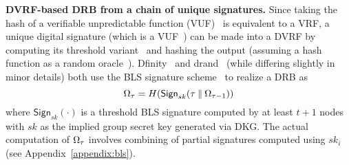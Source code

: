 \noindent\textbf{DVRF-based DRB from a chain of unique signatures.} Since taking the hash of a verifiable unpredictable function (VUF)~\cite{micali1999verifiable} is equivalent to a VRF, a unique digital signature (which is a VUF~\cite{dodis2005verifiable}) can be made into a DVRF by computing its threshold variant~\cite{boldyreva2003threshold} and hashing the output (assuming a hash function as a random oracle~\cite{bellare1993random}). Dfinity~\cite{camenisch2022internet} and drand~\cite{drand} (while differing slightly in minor details) both use the BLS signature scheme~\cite{boneh2001short} to realize a DRB as
\[
\Omega_\tau = H(\mathsf{Sign}_{sk}(\tau \mathbin\Vert \Omega_{\tau - 1}))
\]
where $\mathsf{Sign}_{sk}(\cdot)$ is a threshold BLS signature computed by at least $t + 1$ nodes with $sk$ as the implied group secret key generated via DKG. The actual computation of $\Omega_\tau$ involves combining of partial signatures computed using $sk_i$ (see Appendix~\ref{appendix:bls}).\\

